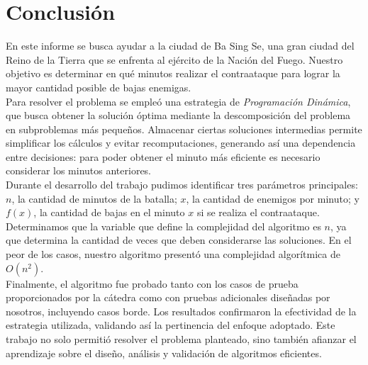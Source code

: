 \section{Conclusión}
En este informe se busca ayudar a la ciudad de Ba Sing Se, una gran ciudad del Reino de la Tierra que se enfrenta al ejército de la Nación del Fuego. Nuestro objetivo es determinar en qué minutos realizar el contraataque para lograr la mayor cantidad posible de bajas enemigas.\\

Para resolver el problema se empleó una estrategia de \textit{Programación Dinámica}, que busca obtener la solución óptima mediante la descomposición del problema en subproblemas más pequeños. Almacenar ciertas soluciones intermedias permite simplificar los cálculos y evitar recomputaciones, generando así una dependencia entre decisiones: para poder obtener el minuto más eficiente es necesario considerar los minutos anteriores.\\

Durante el desarrollo del trabajo pudimos identificar tres parámetros principales: $n$, la cantidad de minutos de la batalla; $x$, la cantidad de enemigos por minuto; y $f(x)$, la cantidad de bajas en el minuto $x$ si se realiza el contraataque. Determinamos que la variable que define la complejidad del algoritmo es $n$, ya que determina la cantidad de veces que deben considerarse las soluciones. En el peor de los casos, nuestro algoritmo presentó una complejidad algorítmica de $O(n^2)$.\\

Finalmente, el algoritmo fue probado tanto con los casos de prueba proporcionados por la cátedra como con pruebas adicionales diseñadas por nosotros, incluyendo casos borde. Los resultados confirmaron la efectividad de la estrategia utilizada, validando así la pertinencia del enfoque adoptado. Este trabajo no solo permitió resolver el problema planteado, sino también afianzar el aprendizaje sobre el diseño, análisis y validación de algoritmos eficientes.
